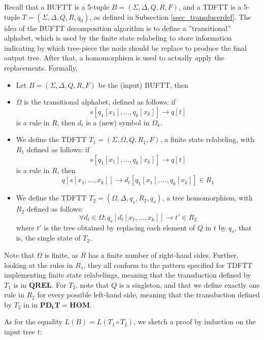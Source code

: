 Recall that a BUFTT is a 5-tuple $B = (\Sigma, \Delta, Q, R, F)$, and
a TDFTT is a 5-tuple $T = (\Sigma, \Delta, Q, R, q_0)$,
as defined in Subsection \ref{ssec_transducerdef}. The idea of the BUFTT
decomposition algorithm is to define a ''transitional'' alphabet, which
is used by the finite state relabeling to store information indicating by
which tree-piece the node should be replace to produce the final output
tree. After that, a homomorphism is used to actually apply the
replacements. Formally,

\begin{itemize}
\item Let $B = (\Sigma, \Delta, Q, R, F)$ be the (input) BUFTT, then

\item $\Omega$ is the transitional alphabet, defined as follows: if 
$$s[q_1[x_1],\ldots,q_k[x_k]] \rightarrow q[t]$$ is a rule in $R$, then
$d_{t}$ is a (new) symbol in $\Omega_k$.

\item We define the TDFTT $T_1 = (\Sigma, \Omega, Q, R_1, F)$, a
finite state relabeling, with $R_1$ defined as follows: if 
$$s[q_1[x_1],\ldots,q_k[x_k]] \rightarrow q[t]$$ is a rule in $R$, then
$$q[s[x_1,\ldots,x_k]] \rightarrow d_{t}[q_1[x_1],\ldots,q_k[x_k]] \in R_1$$

\item We define the TDFTT $T_2 = (\Omega, \Delta, {q_s}, R_2, {q_s})$, a tree
homomorphism, with $R_2$ defined as follows: $$\forall d_t \in \Omega:
q_s[d_t[x_1,\ldots,x_k]] \rightarrow t' \in R_2$$ where $t'$ is the tree obtained by
replacing each element of $Q$ in $t$ by $q_s$, that is, the single state of
$T_2$.
\end{itemize}

Note that $\Omega$ is finite, as $R$ has a finite number of right-hand
sides. Further, looking at the rules in $R_1$, they all conform to the
pattern specified for TDFTT implementing finite state relabelings, meaning
that the transduction defined by $T_1$ is in $\mathbf{QREL}$. For $T_2$,
note that $Q$ is a singleton, and that we define exactly one rule in $R_2$
for every possible left-hand side, meaning that the transduction defined by
$T_2$ in in $\mathbf{PD_tT = HOM}$.

As for the equality $L(B) = L(T_1 \circ T_2)$, we sketch a proof by
induction on the input tree $t$:

